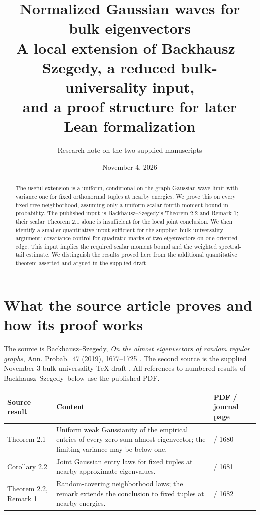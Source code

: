 \documentclass[11pt]{article}
\title{\textbf{Normalized Gaussian waves for bulk eigenvectors}\\[3pt]
\large A local extension of Backhausz--Szegedy, a reduced bulk-universality input,\\
and a proof structure for later Lean formalization}
\author{Research note on the two supplied manuscripts}
\date{November 4, 2026}
\numberwithin{equation}{section}
\theoremstyle{definition}
\theoremstyle{remark}
\newcommand{\BS}{Backhausz--Szegedy}
\begin{document}
\maketitle
\begin{abstract}
The useful extension is a uniform, conditional-on-the-graph Gaussian-wave
limit with variance one for fixed orthonormal tuples at nearby energies.
We prove this on every fixed tree neighborhood, assuming only a uniform
scalar fourth-moment bound in probability. The published input is
\BS's Theorem 2.2 and Remark 1; their scalar Theorem 2.1 alone is insufficient
for the local joint conclusion. We then identify a smaller quantitative
input sufficient for the supplied bulk-universality argument: covariance
control for quadratic marks of two eigenvectors on one oriented edge.
This input implies the required scalar moment bound and the weighted
spectral-tail estimate. We distinguish the results proved here from the
additional quantitative theorem asserted and argued in the supplied draft.
\end{abstract}

\section{What the source article proves and how its proof works}
The source is \BS, \emph{On the almost eigenvectors of random regular
graphs}, Ann. Probab.\ 47 (2019), 1677--1725 \cite{BS}. The second source
is the supplied November 3 bulk-universality TeX draft \cite{Bulk}.
All references to numbered results of \BS\ below use the published PDF.

\begin{center}
\small
\begin{tabular}{>{\raggedright\arraybackslash}p{.25\linewidth}>{\raggedright\arraybackslash}p{.48\linewidth}>{\raggedright\arraybackslash}p{.16\linewidth}}
\toprule
Source result & Content & PDF / journal page\\
\midrule
Theorem 2.1 & Uniform weak Gaussianity of the empirical entries of every
zero-sum almost eigenvector; the limiting variance may be below one.
& 4 / 1680\\[3pt]
Corollary 2.2 & Joint Gaussian entry laws for fixed tuples at nearby
approximate eigenvalues. & 5 / 1681\\[3pt]
Theorem 2.2, Remark 1 & Random-covering neighborhood laws; the remark
extends the conclusion to fixed tuples at nearby energies.
& 6 / 1682\\
\bottomrule
\end{tabular}
\end{center}
\end{document}
